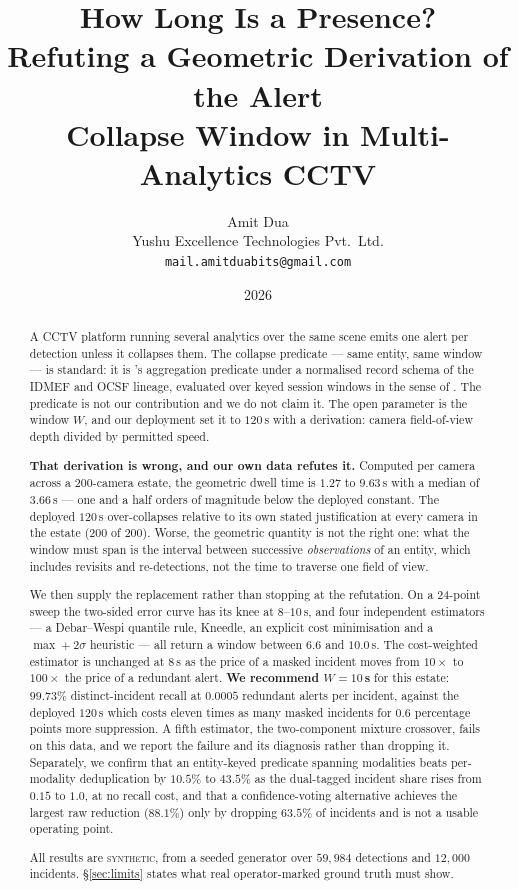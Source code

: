 \documentclass[11pt,a4paper]{article}
\title{How Long Is a Presence?\\Refuting a Geometric Derivation of the Alert\\Collapse Window in Multi-Analytics CCTV}
\author{Amit Dua\\Yushu Excellence Technologies Pvt.\ Ltd.\\\texttt{mail.amitduabits@gmail.com}}
\date{2026}
\newcommand{\synth}{\textsc{synthetic}}
\begin{document}
\maketitle

\begin{abstract}
A CCTV platform running several analytics over the same scene emits one alert per
detection unless it collapses them. The collapse predicate --- same entity, same
window --- is standard: it is \citet{debar2001aggregation}'s aggregation predicate
under a normalised record schema of the IDMEF \citep{idmef2007} and OCSF
\citep{ocsf} lineage, evaluated over keyed session windows in the sense of
\citet{akidau2015dataflow}. The predicate is not our contribution and we do not
claim it. The open parameter is the window $W$, and our deployment set it to
$120$\,s with a derivation: camera field-of-view depth divided by permitted speed.

\textbf{That derivation is wrong, and our own data refutes it.} Computed per
camera across a 200-camera estate, the geometric dwell time is $1.27$ to
$9.63$\,s with a median of $3.66$\,s --- one and a half orders of magnitude below
the deployed constant. The deployed $120$\,s over-collapses relative to its own
stated justification at every camera in the estate ($200$ of $200$). Worse, the
geometric quantity is not the right one: what the window must span is the interval
between successive \emph{observations} of an entity, which includes revisits and
re-detections, not the time to traverse one field of view.

We then supply the replacement rather than stopping at the refutation. On a
24-point sweep the two-sided error curve has its knee at $8$--$10$\,s, and four
independent estimators --- a Debar--Wespi quantile rule, Kneedle, an explicit
cost minimisation and a $\max + 2\sigma$ heuristic --- all return a window
between $6.6$ and $10.0$\,s. The cost-weighted estimator is unchanged at $8$\,s
as the price of a masked incident moves from $10\times$ to $100\times$ the price
of a redundant alert. \textbf{We recommend $W = 10$\,s} for this estate:
$99.73\%$ distinct-incident recall at $0.0005$ redundant alerts per incident,
against the deployed $120$\,s which costs eleven times as many masked incidents
for $0.6$ percentage points more suppression. A fifth estimator, the
two-component mixture crossover, fails on this data, and we report the failure
and its diagnosis rather than dropping it. Separately, we confirm
that an entity-keyed predicate spanning modalities beats per-modality
deduplication by $10.5\%$ to $43.5\%$ as the dual-tagged incident share rises from
$0.15$ to $1.0$, at no recall cost, and that a confidence-voting alternative
achieves the largest raw reduction ($88.1\%$) only by dropping $63.5\%$ of
incidents and is not a usable operating point.

All results are \synth{}, from a seeded generator over $59{,}984$ detections and
$12{,}000$ incidents. \S\ref{sec:limits} states what real operator-marked ground
truth must show.
\end{abstract}
\end{document}
